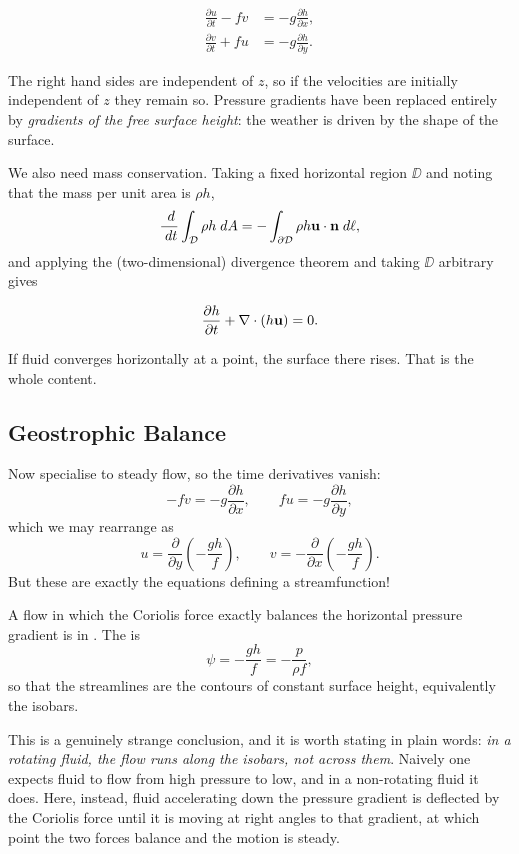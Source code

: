 \documentclass[a4paper]{scrartcl}
\newcommand{\pd}[2]{\frac{\partial #1}{\partial #2}}
\begin{document}
\begin{proposition}
	\begin{align*}
		\pd{u}{t} - fv &= -g\pd{h}{x}, \\
		\pd{v}{t} + fu &= -g\pd{h}{y}.
	\end{align*}
\end{proposition}

The right hand sides are independent of $z$, so if the velocities are initially independent of $z$ they remain so. Pressure gradients have been replaced entirely by \emph{gradients of the free surface height}: the weather is driven by the shape of the surface.

We also need mass conservation. Taking a fixed horizontal region $\DD$ and noting that the mass per unit area is $\rho h$,
$$
\frac{\; d}{\; d t}\int_{\mathcal{D}} \rho h \; d A = -\int_{\partial\mathcal{D}} \rho h \mathbf{u} \cdot \mathbf{n} \; d \ell,
$$
and applying the (two-dimensional) divergence theorem and taking $\DD$ arbitrary gives

\begin{proposition}
	$$
	\pd{h}{t} + \nabla\cdot(h\vv u) = 0.
	$$
\end{proposition}

If fluid converges horizontally at a point, the surface there rises. That is the whole content.

\subsection{Geostrophic Balance}

Now specialise to steady flow, so the time derivatives vanish:
$$
-fv = -g\pd{h}{x}, \qquad fu = -g\pd{h}{y},
$$
which we may rearrange as
$$
u = \pd{}{y}\left(-\frac{gh}{f}\right), \qquad v = -\pd{}{x}\left(-\frac{gh}{f}\right).
$$
But these are exactly the equations defining a streamfunction!

\begin{definition}
	A flow in which the Coriolis force exactly balances the horizontal pressure gradient is in . The  is
	$$
	\psi = -\frac{gh}{f} = -\frac{p}{\rho f},
	$$
	so that the streamlines are the contours of constant surface height, equivalently the isobars.
\end{definition}

This is a genuinely strange conclusion, and it is worth stating in plain words: \emph{in a rotating fluid, the flow runs along the isobars, not across them}. Naively one expects fluid to flow from high pressure to low, and in a non-rotating fluid it does. Here, instead, fluid accelerating down the pressure gradient is deflected by the Coriolis force until it is moving at right angles to that gradient, at which point the two forces balance and the motion is steady.
\end{document}
